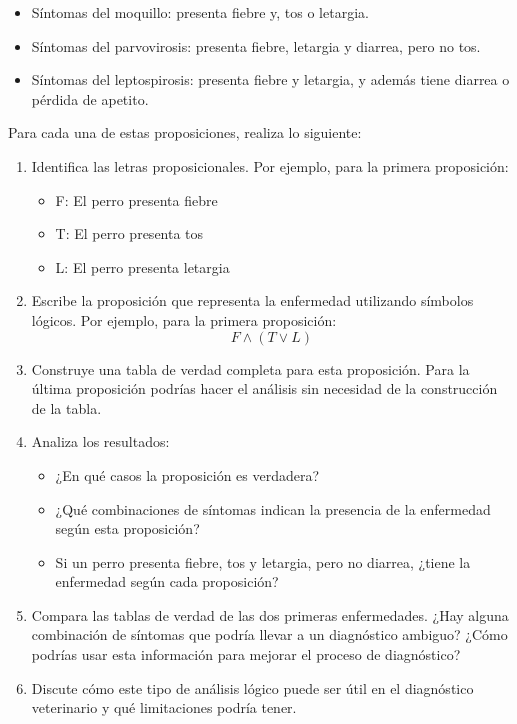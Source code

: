 \documentclass[a4,11pt]{aleph-notas}
\begin{document}
\begin{itemize}[leftmargin=*]
    \item Síntomas del moquillo: presenta fiebre y, tos o letargia.
    \item Síntomas del parvovirosis: presenta fiebre, letargia y diarrea, pero no tos.
    \item Síntomas del leptospirosis: presenta fiebre y letargia, y además tiene diarrea o pérdida de apetito.
\end{itemize}

Para cada una de estas proposiciones, realiza lo siguiente:

\begin{enumerate}
    \item Identifica las letras proposicionales. Por ejemplo, para la primera proposición:
       \begin{itemize}
         \item F: El perro presenta fiebre
         \item T: El perro presenta tos
         \item L: El perro presenta letargia
       \end{itemize}
    
    \item Escribe la proposición que representa la enfermedad utilizando símbolos lógicos. Por ejemplo, para la primera proposición:
       \[F \land (T \lor L)\]
    
    \item Construye una tabla de verdad completa para esta proposición. Para la última proposición podrías hacer el análisis sin necesidad de la construcción de la tabla.
    
    \item Analiza los resultados:
       \begin{itemize}
         \item ¿En qué casos la proposición es verdadera?
         \item ¿Qué combinaciones de síntomas indican la presencia de la enfermedad según esta proposición?
         \item Si un perro presenta fiebre, tos y letargia, pero no diarrea, ¿tiene la enfermedad según cada proposición?
       \end{itemize}

    \item Compara las tablas de verdad de las dos primeras enfermedades. ¿Hay alguna combinación de síntomas que podría llevar a un diagnóstico ambiguo? ¿Cómo podrías usar esta información para mejorar el proceso de diagnóstico?
    
    \item Discute cómo este tipo de análisis lógico puede ser útil en el diagnóstico veterinario y qué limitaciones podría tener.
\end{enumerate}
\end{document}
